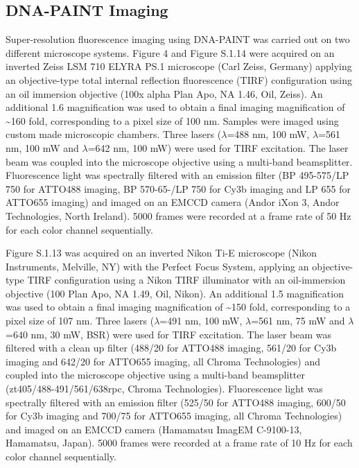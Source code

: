 \subsection{DNA-PAINT Imaging}
Super-resolution fluorescence imaging using DNA-PAINT was carried out on two different microscope systems. Figure 4 and Figure S.1.14 were acquired on an inverted Zeiss LSM 710 ELYRA PS.1 microscope (Carl Zeiss, Germany) applying an objective-type total internal reflection fluorescence (TIRF) configuration using an oil immersion objective (100x alpha Plan Apo, NA 1.46, Oil, Zeiss). An additional 1.6 magnification was used to obtain a final imaging magnification of \textasciitilde160 fold, corresponding to a pixel size of 100 nm. Samples were imaged using custom made microscopic chambers. Three lasers ($\lambda$=488 nm, 100 mW, $\lambda$=561 nm, 100 mW and $\lambda$=642 nm, 100 mW) were used for TIRF excitation. The laser beam was coupled into the microscope objective using a multi-band beamsplitter. Fluorescence light was spectrally filtered with an emission filter (BP 495-575/LP 750 for ATTO488 imaging, BP 570-65-/LP 750 for Cy3b imaging and LP 655 for ATTO655 imaging) and imaged on an EMCCD camera (Andor iXon 3, Andor Technologies, North Ireland). 5000 frames were recorded at a frame rate of 50 Hz for each color channel sequentially.

Figure S.1.13 was acquired on an inverted Nikon Ti-E microscope (Nikon Instruments, Melville, NY) with the Perfect Focus System, applying an objective-type TIRF configuration using a Nikon TIRF illuminator with an oil-immersion objective (100 Plan Apo, NA 1.49, Oil, Nikon). An additional 1.5 magnification was used to obtain a final imaging magnification of \textasciitilde150 fold, corresponding to a pixel size of 107 nm. Three lasers ($\lambda$=491 nm, 100 mW, $\lambda$=561 nm, 75 mW and $\lambda$=640 nm, 30 mW, BSR) were used for TIRF excitation. The laser beam was filtered with a clean up filter (488/20 for ATTO488 imaging, 561/20 for Cy3b imaging and 642/20 for ATTO655 imaging, all Chroma Technologies) and coupled into the microscope objective using a multi-band beamsplitter (zt405/488-491/561/638rpc, Chroma Technologies). Fluorescence light was spectrally filtered with an emission filter (525/50 for ATTO488 imaging, 600/50 for Cy3b imaging and 700/75 for ATTO655 imaging, all Chroma Technologies) and imaged on an EMCCD camera (Hamamatsu ImagEM C-9100-13, Hamamatsu, Japan). 5000 frames were recorded at a frame rate of 10 Hz for each color channel sequentially. 

